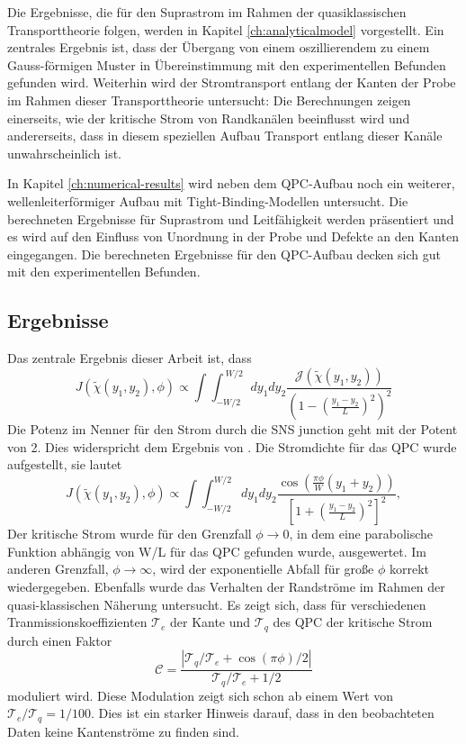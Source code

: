 Die Ergebnisse, die f\"ur den Suprastrom im Rahmen der quasiklassischen Transporttheorie folgen, werden in Kapitel  \ref{ch:analyticalmodel} vorgestellt. Ein zentrales Ergebnis ist, dass der \"Ubergang von einem oszillierendem zu einem Gauss-f\"ormigen Muster in \"Ubereinstimmung mit den experimentellen Befunden gefunden wird. Weiterhin wird der Stromtransport entlang der Kanten der Probe im Rahmen dieser Transporttheorie untersucht: Die Berechnungen zeigen einerseits, wie der kritische Strom von Randkan\"alen beeinflusst wird und andererseits, dass in diesem speziellen Aufbau Transport entlang dieser Kan\"ale unwahrscheinlich ist.

In Kapitel \ref{ch:numerical-results} wird neben dem QPC-Aufbau noch ein weiterer, wellenleiterf\"ormiger Aufbau mit Tight-Binding-Modellen untersucht. Die berechneten Ergebnisse f\"ur Suprastrom und Leitf\"ahigkeit werden pr\"asentiert und es wird auf den Einfluss von Unordnung in der Probe und Defekte an den Kanten eingegangen. Die berechneten Ergebnisse f\"ur den QPC-Aufbau decken sich gut mit den experimentellen Befunden.

\subsection*{Ergebnisse}
Das zentrale Ergebnis dieser Arbeit ist, dass
\begin{equation}
J(\tilde{\chi}(y_1, y_2), \phi) \propto \int \int_{-W/2}^{~W/2} dy_1 dy_2 \frac{ \mathcal{J}(\tilde{\chi}(y_1, y_2)) }{ \left( 1 - \left(\frac{y_1 - y_2}{L}\right)^2 \right)^2 }
\end{equation}
Die Potenz im Nenner f\"ur den Strom durch die SNS junction geht mit der Potent von 2. Dies widerspricht dem Ergebnis von \cite{Barzykin1999}. 
Die Stromdichte f\"ur das QPC wurde aufgestellt, sie lautet
\begin{equation}
J(\tilde{\chi}(y_1, y_2), \phi) \propto \int \int_{-W/2}^{W/2} d y_1 d y_2 \frac{\cos \left( \frac{\pi \phi}{W}(y_1 + y_2) \right)}{\left[ 1 + \left(\frac{y_1 - y_2}{L}\right)^2\right]^2} \label{eq:josephson_current},
\end{equation}
Der kritische Strom wurde f\"ur den Grenzfall $\phi \rightarrow 0$, in dem eine parabolische Funktion abh\"angig von W/L f\"ur das QPC gefunden wurde, ausgewertet. Im anderen Grenzfall, $\phi \rightarrow \infty$, wird der exponentielle Abfall f\"ur gro{\ss}e $\phi$ korrekt wiedergegeben. Ebenfalls wurde das Verhalten der Randstr\"ome im Rahmen der quasi-klassischen N\"aherung untersucht. Es zeigt sich, dass f\"ur verschiedenen Tranmissionskoeffizienten $\mathcal{T}_e$ der Kante und $\mathcal{T}_q$ des QPC der kritische Strom durch einen Faktor 
\begin{equation}
\mathcal{C} =  \frac{| \mathcal{T}_q / \mathcal{T}_e + \cos \left( \pi \phi \right)/2 |}{\mathcal{T}_q / \mathcal{T}_e + 1/2}
\end{equation}
moduliert wird. Diese Modulation zeigt sich schon ab einem Wert von $\mathcal{T}_e/ \mathcal{T}_q = 1 / 100$. Dies ist ein starker Hinweis darauf, dass in den beobachteten Daten keine Kantenstr\"ome zu finden sind. 

